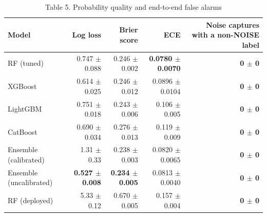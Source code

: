 \begin{table}[htbp]
\centering
\small
\caption{Table 5. Probability quality and end-to-end false alarms}
\label{tab:table5_calibration}
\begin{tabular}{lrrrr}
\toprule
Model & Log loss & Brier score & ECE & Noise captures with a non-NOISE label \\
\midrule
RF (tuned) & 0.747 $\pm$ 0.088 & 0.246 $\pm$ 0.002 & \textbf{0.0780 $\pm$ 0.0070} & \textbf{0 $\pm$ 0} \\
XGBoost & 0.614 $\pm$ 0.025 & 0.246 $\pm$ 0.012 & 0.0896 $\pm$ 0.0104 & \textbf{0 $\pm$ 0} \\
LightGBM & 0.751 $\pm$ 0.018 & 0.243 $\pm$ 0.006 & 0.106 $\pm$ 0.005 & \textbf{0 $\pm$ 0} \\
CatBoost & 0.690 $\pm$ 0.034 & 0.276 $\pm$ 0.013 & 0.119 $\pm$ 0.009 & \textbf{0 $\pm$ 0} \\
Ensemble (calibrated) & 1.31 $\pm$ 0.33 & 0.238 $\pm$ 0.003 & 0.0820 $\pm$ 0.0065 & \textbf{0 $\pm$ 0} \\
Ensemble (uncalibrated) & \textbf{0.527 $\pm$ 0.008} & \textbf{0.234 $\pm$ 0.005} & 0.0813 $\pm$ 0.0040 & \textbf{0 $\pm$ 0} \\
RF (deployed) & 5.33 $\pm$ 0.12 & 0.670 $\pm$ 0.005 & 0.157 $\pm$ 0.004 & \textbf{0 $\pm$ 0} \\
\bottomrule
\end{tabular}
\end{table}
